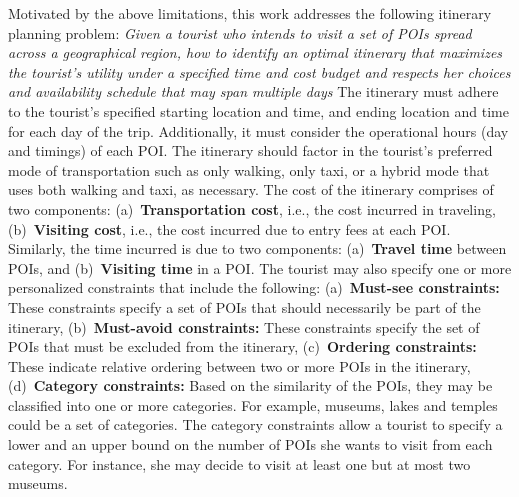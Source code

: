 Motivated by the above limitations, this work addresses the following itinerary planning problem: \emph{Given a tourist who intends to visit a set of POIs spread across a geographical region, how to identify an optimal itinerary that maximizes the tourist's utility under a specified time and cost budget and respects her choices and availability schedule that may span multiple days} The itinerary must adhere to the tourist's specified starting location and time, and ending location and time for each day of the trip. Additionally, it must consider the operational hours (day and timings) of each POI. The itinerary should factor in the tourist's preferred mode of transportation such as only walking, only taxi, or a hybrid mode that uses both walking and taxi, as necessary. The cost of the itinerary comprises of two components: (a)~\textbf{Transportation cost}, i.e., the cost incurred in traveling, (b)~\textbf{Visiting cost}, i.e., the cost incurred due to entry fees at each POI. Similarly, the time incurred is due to two components: (a)~\textbf{Travel time} between POIs, and (b)~\textbf{Visiting time} in a POI. The tourist may also specify one or more personalized constraints that include the following: (a)~\textbf{Must-see constraints:} These constraints specify a set of POIs that should necessarily be part of the itinerary, (b)~\textbf{Must-avoid constraints:} These constraints specify the set of POIs that must be excluded from the itinerary, (c)~\textbf{Ordering constraints:} These indicate relative ordering between two or more POIs in the itinerary, (d)~\textbf{Category constraints:} Based on the similarity of the POIs, they may be classified into one or more categories. For example, museums, lakes and temples could be a set of categories. The category constraints allow a tourist to specify a lower and an upper bound on the number of POIs she wants to visit from each category. For instance, she may decide to visit at least one but at most two museums. 

